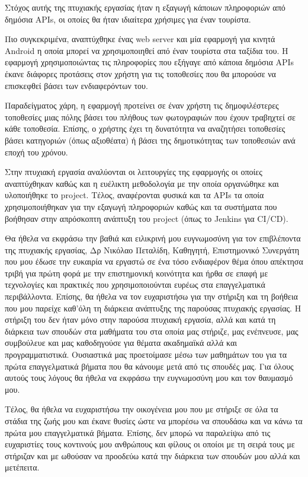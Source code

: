 \documentclass[oneside, 12pt]{book}
\begin{document}
\Titlepage
\Declarationpage
\begin{Abstract}
Στόχος αυτής της πτυχιακής εργασίας ήταν η εξαγωγή κάποιων πληροφοριών από δημόσια APIs, οι οποίες θα ήταν ιδιαίτερα χρήσιμες για έναν τουρίστα. 

Πιο συγκεκριμένα, αναπτύχθηκε ένας web server και μία εφαρμογή για κινητά Android η οποία μπορεί να χρησιμοποιηθεί από έναν τουρίστα στα ταξίδια του. Η εφαρμογή χρησιμοποιώντας τις πληροφορίες που εξήγαγε από κάποια δημόσια APIs έκανε διάφορες προτάσεις στον χρήστη για τις τοποθεσίες που θα μπορούσε να επισκεφθεί βάσει των ενδιαφερόντων του.

Παραδείγματος χάρη, η εφαρμογή προτείνει σε έναν χρήστη τις δημοφιλέστερες τοποθεσίες μιας πόλης βάσει του πλήθους των φωτογραφιών που έχουν τραβηχτεί σε κάθε τοποθεσία. Επίσης, ο χρήστης έχει τη δυνατότητα να αναζητήσει τοποθεσίες βάσει κατηγοριών (όπως αξιοθέατα) ή βάσει της δημοτικότητας των τοποθεσιών ανά εποχή του χρόνου.

Στην πτυχιακή εργασία αναλύονται οι λειτουργίες της εφαρμογής οι οποίες αναπτύχθηκαν καθώς και η ευέλικτη μεθοδολογία με την οποία οργανώθηκε και υλοποιήθηκε το project. Τέλος, αναφέρονται φυσικά και τα APIs τα οποία χρησιμοποιήθηκαν για την εξαγωγή πληροφοριών καθώς και τα συστήματα που βοήθησαν στην απρόσκοπτη ανάπτυξη του project (όπως το Jenkins για CI/CD).
\end{Abstract}
\tableofcontents

\listoftables
\listoffigures

\begin{Acknowledgement}
Θα ήθελα να εκφράσω την βαθιά και ειλικρινή μου ευγνωμοσύνη για τον επιβλέποντα της πτυχιακής εργασίας, Δρ Νικόλαο Πεταλίδη, Καθηγητή, Επιστημονικό Συνεργάτη που μου έδωσε την ευκαιρία να εργαστώ σε ένα τόσο ενδιαφέρον θέμα όπου απέκτησα τριβή για πρώτη φορά με την επιστημονική κοινότητα και ήρθα σε επαφή  με τεχνολογίες και πρακτικές που χρησιμοποιούνται ευρέως στα επαγγελματικά περιβάλλοντα. Επίσης, θα ήθελα να τον ευχαριστήσω για την στήριξη και τη βοήθεια που μου παρείχε καθ'όλη τη διάρκεια ανάπτυξης της παρούσας πτυχιακής εργασίας. Η στήριξη του δεν ήταν μόνο στην παρούσα πτυχιακή εργασία, αλλά και κατά τη διάρκεια των σπουδών στα μαθήματα του στα οποία μας στήριζε, μας ενέπνευσε, μας συμβούλευε και μας καθοδηγούσε για θέματα ακαδημαϊκά αλλά και προγραμματιστικά. Ουσιαστικά μας προετοίμασε μέσω των μαθημάτων του για τα πρώτα επαγγελματικά βήματα που θα κάνουμε μετά από τις σπουδές μας. Για όλους αυτούς τους λόγους θα ήθελα να εκφράσω την ευγνωμοσύνη μου και τον θαυμασμό μου.

Τέλος, θα ήθελα να ευχαριστήσω την οικογένεια μου που με στήριξε σε όλα τα στάδια της ζωής μου και έκανε θυσίες ώστε να μπορέσω να σπουδάσω και να κάνω τα πρώτα μου επαγγελματικά βήματα. Επίσης, δεν μπορώ να παραλείψω από τις ευχαριστίες τους κοντινούς μου ανθρώπους και φίλους οι οποίοι με τη σειρά τους με στήριζαν και με ωθούσαν να προοδεύω κατά την διάρκεια των σπουδών μου αλλά και μετέπειτα.
\end{Acknowledgement}
\end{document}
